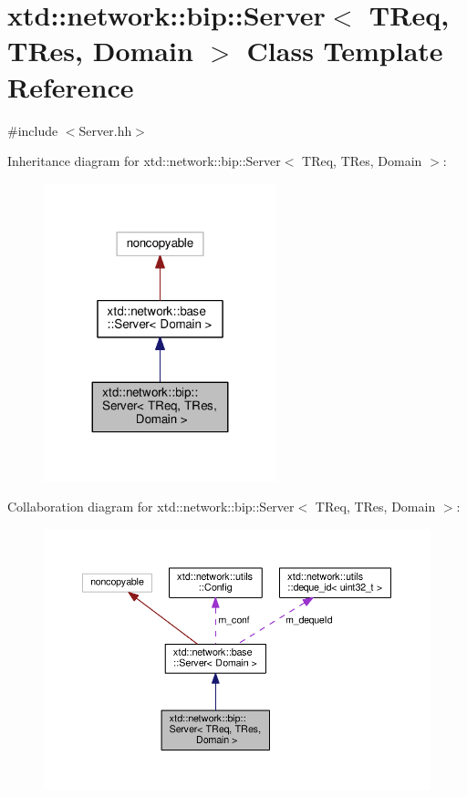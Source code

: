 \hypertarget{classxtd_1_1network_1_1bip_1_1Server}{}\section{xtd\+:\+:network\+:\+:bip\+:\+:Server$<$ T\+Req, T\+Res, Domain $>$ Class Template Reference}
\label{classxtd_1_1network_1_1bip_1_1Server}


{\ttfamily \#include $<$Server.\+hh$>$}



Inheritance diagram for xtd\+:\+:network\+:\+:bip\+:\+:Server$<$ T\+Req, T\+Res, Domain $>$\+:
\nopagebreak
\begin{figure}[H]
\begin{center}
\leavevmode
\includegraphics[width=191pt]{classxtd_1_1network_1_1bip_1_1Server__inherit__graph}
\end{center}
\end{figure}


Collaboration diagram for xtd\+:\+:network\+:\+:bip\+:\+:Server$<$ T\+Req, T\+Res, Domain $>$\+:
\nopagebreak
\begin{figure}[H]
\begin{center}
\leavevmode
\includegraphics[width=350pt]{classxtd_1_1network_1_1bip_1_1Server__coll__graph}
\end{center}
\end{figure}
